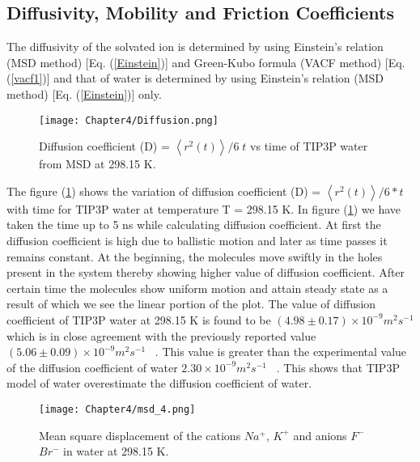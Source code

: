 \subsection {Diffusivity, Mobility and Friction Coefficients}
The diffusivity of the solvated ion  is determined by   using Einstein's relation (MSD method) [Eq. (\ref{Einstein})] and Green-Kubo formula (VACF method) [Eq.(\ref{vacf1})]  and that of water is determined by using Einstein's relation (MSD method) [Eq. (\ref{Einstein})] only.

\begin{figure}[h!]
 \centering
\texttt{[image: Chapter4/Diffusion.png]}
\caption[Diffusion coefficient  vs time of TIP3P water from MSD. ]{ Diffusion coefficient (D) = $\left\langle r^2(t)\right\rangle / 6\;t$ vs time of TIP3P water from MSD  at 298.15 K. }
\label{diffusionvstime1}
\end{figure}

 The figure (\ref{diffusionvstime1}) shows the variation of diffusion coefficient (D) = $\left\langle r^2(t)\right\rangle / 6*t$  with
time for TIP3P water at temperature T = 298.15 K. In  figure (\ref{diffusionvstime1}) we  have taken the time up to 5 ns while calculating diffusion coefficient. At first the diffusion coefficient is high due to ballistic motion and later as time passes it remains constant.  At the beginning, the molecules  move swiftly in the holes present in the system thereby showing higher value of diffusion coefficient. After certain time the molecules show uniform motion and attain steady state  as a result of which we see the linear portion of the plot. The value of diffusion coefficient of TIP3P water at 298.15 K is found to be  $(4.98 \pm 0.17) \times 10^{-9} m^2s^{-1}$ which is in close agreement with  the previously reported value  $(5.06 \pm 0.09) \times 10^{-9} m^2s^{-1}$~ \citep{mahoney2001diffusion}. This value is greater than the experimental value of the diffusion coefficient of water $2.30 \times 10^{-9} m^2s^{-1}$~ \citep{mills1973self}. This shows that TIP3P model of water overestimate the diffusion coefficient of water. 

\begin{figure}[h!]
 \centering
\texttt{[image: Chapter4/msd\_4.png]}
\caption[Mean square displacement  of the cations   and anions in water. ]{ Mean square displacement  of the cations $Na^+$, $K^+$  and anions $F^-$ $Br^-$ in water  at 298.15 K. }
\label{msd-4}
\end{figure}

